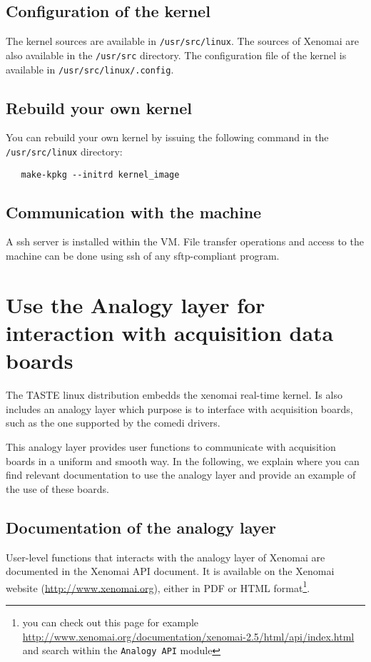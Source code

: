 \documentclass[11pt]{book}
\begin{document}
   \section{Configuration of the kernel}
   The kernel sources are available in \texttt{/usr/src/linux}. The sources of
   Xenomai are also available in the  \texttt{/usr/src} directory. The
   configuration file of the kernel is available in
   \texttt{/usr/src/linux/.config}.

   \section{Rebuild your own kernel}
   You can rebuild your own kernel by issuing the following command in the
   \texttt{/usr/src/linux} directory:

   \begin{verbatim}
   make-kpkg --initrd kernel_image
   \end{verbatim}


   \section{Communication with the machine}
   A ssh server is installed within the VM. File transfer operations and access
   to the machine can be done using ssh of any sftp-compliant program.



\chapter{Use the Analogy layer for interaction with acquisition data boards}
The TASTE linux distribution embedds the xenomai real-time kernel. Is also
includes an analogy layer which purpose is to interface with acquisition boards,
such as the one supported by the comedi drivers.

This analogy layer provides user functions to communicate with acquisition
boards in a uniform and smooth way. In the following, we explain where you can
find relevant documentation to use the analogy layer and provide an example of
the use of these boards.

   \section{Documentation of the analogy layer}
   User-level functions that interacts with the analogy layer of Xenomai are
   documented in the Xenomai API document. It is available on the Xenomai
   website (\url{http://www.xenomai.org}), either in PDF or HTML
   format\footnote{you can
   check out this page for example
   \url{http://www.xenomai.org/documentation/xenomai-2.5/html/api/index.html}
   and search within the \texttt{Analogy API} module}.
\end{document}
